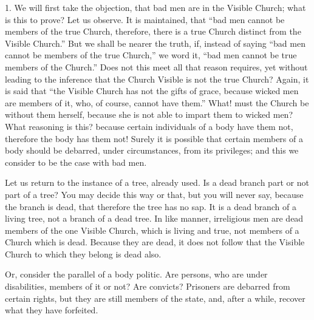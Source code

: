 1. We will first take the objection, that bad men are in the
Visible Church; what is this to prove? Let us observe. It is
maintained, that ``bad men cannot be members of the true Church,
therefore, there is a true Church distinct from the Visible
Church.'' But we shall be nearer the truth, if, instead of saying
``bad men cannot be members of the true Church,'' we word it,
``bad men cannot be true members of the Church.'' Does not
this meet all that reason requires, yet without leading to the
inference that the Church Visible is not the true Church? Again, it is
said that ``the Visible Church has not the gifts of grace, because
wicked men are members of it, who, of course, cannot have them.''
What! must the Church be without them herself, because she is not able
to impart them to wicked men? What reasoning is this? because certain
individuals of a body have them not, therefore the body has them not!
Surely it is possible that certain members of a body should be
debarred, under circumstances, from its privileges; and this we
consider to be the case with bad men.

Let us return to the instance of a tree, already used. Is a dead
branch part or not part of a tree? You may decide this way or that,
but you will never say, because the branch is dead, that therefore the
tree has no sap. It is a dead branch of a living tree, not a branch of
a dead tree. In like manner, irreligious men are dead members of the
one Visible Church, which is living and true, not members of a Church
which is dead. Because they are dead, it does not follow that the
Visible Church to which they belong is dead also.

Or, consider the parallel of a body politic. Are persons, who are
under disabilities, members of it or not? Are convicts? Prisoners are
debarred from certain rights, but they are still members of the state,
and, after a while, recover what they have forfeited.

